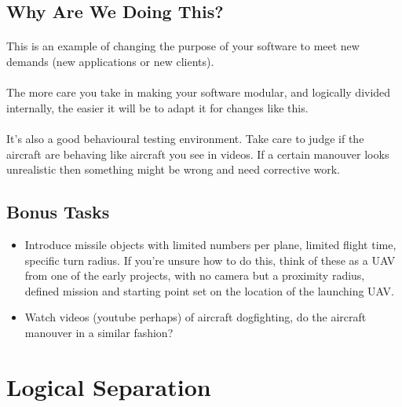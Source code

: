 \documentclass[11pt]{book}
\begin{document}
\subsection{Why Are We Doing This?}

\paragraph{} This is an example of changing the purpose of your software to
meet new demands (new applications or new clients).

\paragraph{} The more care you take in making your software modular, and
logically divided internally, the easier it will be to adapt it for changes
like this.

\paragraph{} It's also a good behavioural testing environment. Take care to
judge if the aircraft are behaving like aircraft you see in videos. If a
certain manouver looks unrealistic then something might be wrong and need
corrective work. 

\subsection{Bonus Tasks}

\begin{itemize}
\item Introduce missile objects with limited numbers per plane, limited flight time, specific turn radius. If you're unsure how to do this, think of these as a UAV from one of the early projects, with no camera but a proximity radius, defined mission and starting point set on the location of the launching UAV.
\item Watch videos (youtube perhaps) of aircraft dogfighting, do the aircraft manouver in a similar fashion?
\end{itemize}

\clearpage


\section{Logical Separation}
\end{document}
